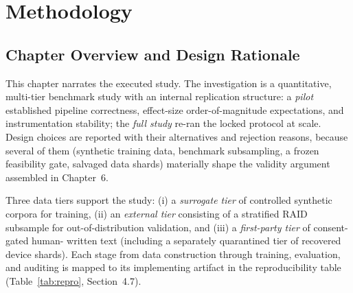 
\chapter{Methodology}

\section{Chapter Overview and Design Rationale}
This chapter narrates the executed study. The investigation is a
quantitative, multi-tier benchmark study with an internal replication
structure: a \emph{pilot} established pipeline correctness, effect-size
order-of-magnitude expectations, and instrumentation stability; the
\emph{full study} re-ran the locked protocol at scale. Design choices are
reported with their alternatives and rejection reasons, because several of
them (synthetic training data, benchmark subsampling, a frozen feasibility
gate, salvaged data shards) materially shape the validity argument
assembled in Chapter~6.

Three data tiers support the study: (i) a \emph{surrogate tier} of
controlled synthetic corpora for training, (ii) an \emph{external tier}
consisting of a stratified RAID subsample for out-of-distribution
validation, and (iii) a \emph{first-party tier} of consent-gated human-
written text (including a separately quarantined tier of recovered device
shards). Each stage from data construction through training, evaluation,
and auditing is mapped to its implementing artifact in the reproducibility
table (Table~\ref{tab:repro}, Section~4.7).

